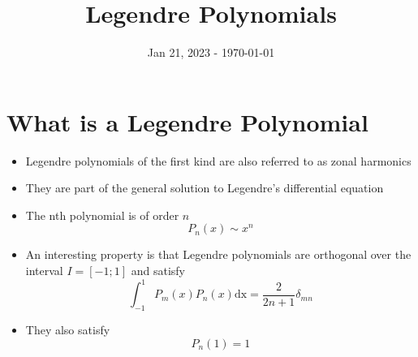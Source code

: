 \documentclass{article}
\title{Legendre Polynomials}
\date{Jan 21, 2023 - \today}
\begin{document}
\maketitle
    \section{What is a Legendre Polynomial}
    \begin{itemize}
        \item Legendre polynomials of the first kind are also referred to as zonal harmonics
        \item They are part of the general solution to Legendre's differential equation
        \item The nth polynomial is of order $n$
            \begin{equation}
                P_n(x) \sim x^n
            \end{equation}
        \item An interesting property is that Legendre polynomials are orthogonal over the interval $I = [-1;1]$ and satisfy
            \begin{equation}
                \int_{-1}^{1} P_m(x)P_n(x) \mathrm{dx} = \frac{2}{2n+1}\delta_{mn}
            \end{equation}
        \item They also satisfy
            \begin{equation}
                P_n(1) = 1 \label{Eq:unitary}
            \end{equation}
    \end{itemize}
\end{document}
